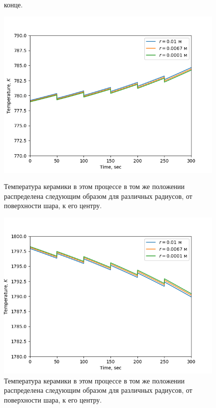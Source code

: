 \documentclass[a4paper,11pt,numreferences,mathsec,kaplist]{isuepsutf8}
\begin{document}
\begin{article}
\begin{figure}[ht]
\begin{minipage}[t]{0.23\textwidth}
{        конце.}
        \label{fig:img2}
    \end{minipage}
    \hfill
    \begin{minipage}[t]{0.23\textwidth}
        \centering
        \includegraphics[width=\textwidth]{img3}
        \caption {Температура керамики в этом процессе в том же
        положении распределена следующим образом для различных
        радиусов, от поверхности шара, к его центру.}
        \label{fig:img3}
    \end{minipage}
    \hfill
    \begin{minipage}[t]{0.23\textwidth}
        \centering
        \includegraphics[width=\textwidth]{img4}
        \caption {Температура керамики в этом процессе в том же
        положении распределена следующим образом для различных
        радиусов, от поверхности шара, к его центру.}
        \label{fig:img4}
    \end{minipage}
\end{figure}


\end{article}
\end{document}
